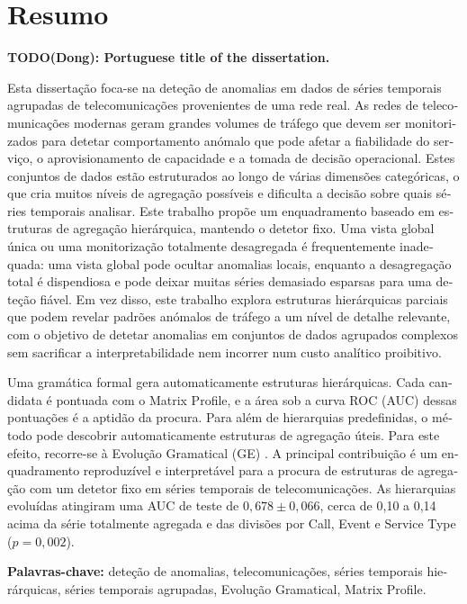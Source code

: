 \clearpage
{}
\section*{Resumo}

\begin{center}
\textbf{TODO(Dong): Portuguese title of the dissertation.}
\end{center}

\begin{otherlanguage}{portuguese}
Esta dissertação foca-se na deteção de anomalias em dados de séries temporais agrupadas de telecomunicações provenientes de uma rede real.
As redes de telecomunicações modernas geram grandes volumes de tráfego que devem ser monitorizados para detetar comportamento anómalo que pode afetar a fiabilidade do serviço, o aprovisionamento de capacidade e a tomada de decisão operacional.
Estes conjuntos de dados estão estruturados ao longo de várias dimensões categóricas, o que cria muitos níveis de agregação possíveis e dificulta a decisão sobre quais séries temporais analisar.
Este trabalho propõe um enquadramento baseado em estruturas de agregação hierárquica, mantendo o detetor fixo.
Uma vista global única ou uma monitorização totalmente desagregada é frequentemente inadequada: uma vista global pode ocultar anomalias locais, enquanto a desagregação total é dispendiosa e pode deixar muitas séries demasiado esparsas para uma deteção fiável.
Em vez disso, este trabalho explora estruturas hierárquicas parciais que podem revelar padrões anómalos de tráfego a um nível de detalhe relevante, com o objetivo de detetar anomalias em conjuntos de dados agrupados complexos sem sacrificar a interpretabilidade nem incorrer num custo analítico proibitivo.

Uma gramática formal gera automaticamente estruturas hierárquicas.
Cada candidata é pontuada com o Matrix Profile, e a área sob a curva ROC (AUC) dessas pontuações é a aptidão da procura.
Para além de hierarquias predefinidas, o método pode descobrir automaticamente estruturas de agregação úteis.
Para este efeito, recorre-se à Evolução Gramatical (\ac{GE}) \parencite{oneill2001grammatical,oneill2003}.
A principal contribuição é um enquadramento reproduzível e interpretável para a procura de estruturas de agregação com um detetor fixo em séries temporais de telecomunicações.
As hierarquias evoluídas atingiram uma AUC de teste de $0{,}678 \pm 0{,}066$, cerca de 0,10 a 0,14 acima da série totalmente agregada e das divisões por Call, Event e Service Type ($p = 0{,}002$).

\noindent\textbf{Palavras-chave:} deteção de anomalias, telecomunicações, séries temporais hierárquicas, séries temporais agrupadas, Evolução Gramatical, Matrix Profile.
\end{otherlanguage}

